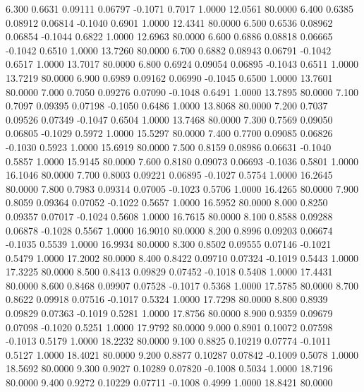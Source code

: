    6.300   0.6631   0.09111   0.06797  -0.1071   0.7017   1.0000  12.0561  80.0000
   6.400   0.6385   0.08912   0.06814  -0.1040   0.6901   1.0000  12.4341  80.0000
   6.500   0.6536   0.08962   0.06854  -0.1044   0.6822   1.0000  12.6963  80.0000
   6.600   0.6886   0.08818   0.06665  -0.1042   0.6510   1.0000  13.7260  80.0000
   6.700   0.6882   0.08943   0.06791  -0.1042   0.6517   1.0000  13.7017  80.0000
   6.800   0.6924   0.09054   0.06895  -0.1043   0.6511   1.0000  13.7219  80.0000
   6.900   0.6989   0.09162   0.06990  -0.1045   0.6500   1.0000  13.7601  80.0000
   7.000   0.7050   0.09276   0.07090  -0.1048   0.6491   1.0000  13.7895  80.0000
   7.100   0.7097   0.09395   0.07198  -0.1050   0.6486   1.0000  13.8068  80.0000
   7.200   0.7037   0.09526   0.07349  -0.1047   0.6504   1.0000  13.7468  80.0000
   7.300   0.7569   0.09050   0.06805  -0.1029   0.5972   1.0000  15.5297  80.0000
   7.400   0.7700   0.09085   0.06826  -0.1030   0.5923   1.0000  15.6919  80.0000
   7.500   0.8159   0.08986   0.06631  -0.1040   0.5857   1.0000  15.9145  80.0000
   7.600   0.8180   0.09073   0.06693  -0.1036   0.5801   1.0000  16.1046  80.0000
   7.700   0.8003   0.09221   0.06895  -0.1027   0.5754   1.0000  16.2645  80.0000
   7.800   0.7983   0.09314   0.07005  -0.1023   0.5706   1.0000  16.4265  80.0000
   7.900   0.8059   0.09364   0.07052  -0.1022   0.5657   1.0000  16.5952  80.0000
   8.000   0.8250   0.09357   0.07017  -0.1024   0.5608   1.0000  16.7615  80.0000
   8.100   0.8588   0.09288   0.06878  -0.1028   0.5567   1.0000  16.9010  80.0000
   8.200   0.8996   0.09203   0.06674  -0.1035   0.5539   1.0000  16.9934  80.0000
   8.300   0.8502   0.09555   0.07146  -0.1021   0.5479   1.0000  17.2002  80.0000
   8.400   0.8422   0.09710   0.07324  -0.1019   0.5443   1.0000  17.3225  80.0000
   8.500   0.8413   0.09829   0.07452  -0.1018   0.5408   1.0000  17.4431  80.0000
   8.600   0.8468   0.09907   0.07528  -0.1017   0.5368   1.0000  17.5785  80.0000
   8.700   0.8622   0.09918   0.07516  -0.1017   0.5324   1.0000  17.7298  80.0000
   8.800   0.8939   0.09829   0.07363  -0.1019   0.5281   1.0000  17.8756  80.0000
   8.900   0.9359   0.09679   0.07098  -0.1020   0.5251   1.0000  17.9792  80.0000
   9.000   0.8901   0.10072   0.07598  -0.1013   0.5179   1.0000  18.2232  80.0000
   9.100   0.8825   0.10219   0.07774  -0.1011   0.5127   1.0000  18.4021  80.0000
   9.200   0.8877   0.10287   0.07842  -0.1009   0.5078   1.0000  18.5692  80.0000
   9.300   0.9027   0.10289   0.07820  -0.1008   0.5034   1.0000  18.7196  80.0000
   9.400   0.9272   0.10229   0.07711  -0.1008   0.4999   1.0000  18.8421  80.0000
